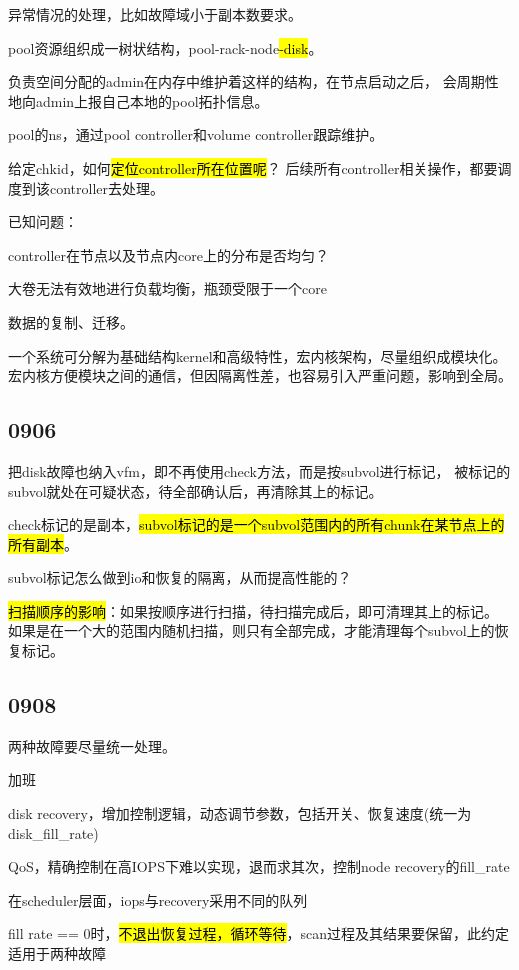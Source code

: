 异常情况的处理，比如故障域小于副本数要求。

pool资源组织成一树状结构，pool-rack-node\hl{-disk}。

负责空间分配的admin在内存中维护着这样的结构，在节点启动之后，
会周期性地向admin上报自己本地的pool拓扑信息。

pool的ns，通过pool controller和volume controller跟踪维护。

给定chkid，如何\hl{定位controller所在位置呢}？
后续所有controller相关操作，都要调度到该controller去处理。

已知问题：
\begin{enumbox}
\item controller在节点以及节点内core上的分布是否均匀？
\item 大卷无法有效地进行负载均衡，瓶颈受限于一个core
\end{enumbox}

数据的复制、迁移。

一个系统可分解为基础结构kernel和高级特性，宏内核架构，尽量组织成模块化。
宏内核方便模块之间的通信，但因隔离性差，也容易引入严重问题，影响到全局。

\subsection{0906}

把disk故障也纳入vfm，即不再使用check方法，而是按subvol进行标记，
被标记的subvol就处在可疑状态，待全部确认后，再清除其上的标记。

check标记的是副本，\hl{subvol标记的是一个subvol范围内的所有chunk在某节点上的所有副本}。

subvol标记怎么做到io和恢复的隔离，从而提高性能的？

\hl{扫描顺序的影响}：如果按顺序进行扫描，待扫描完成后，即可清理其上的标记。
如果是在一个大的范围内随机扫描，则只有全部完成，才能清理每个subvol上的恢复标记。

\subsection{0908}

两种故障要尽量统一处理。

加班
\begin{enumbox}
\item disk recovery，增加控制逻辑，动态调节参数，包括开关、恢复速度(统一为disk\_fill\_rate)
\item QoS，精确控制在高IOPS下难以实现，退而求其次，控制node recovery的fill\_rate
\item 在scheduler层面，iops与recovery采用不同的队列
\item fill rate == 0时，\hl{不退出恢复过程，循环等待}，scan过程及其结果要保留，此约定适用于两种故障
\end{enumbox}

